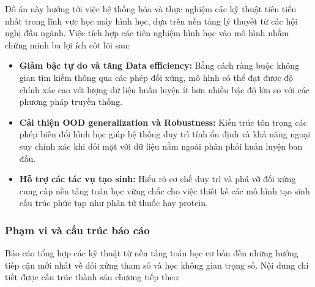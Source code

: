 Đồ án này hướng tới việc hệ thống hóa và thực nghiệm các kỹ thuật tiên tiến nhất trong lĩnh vực học máy hình học, dựa trên nền tảng lý thuyết từ các hội nghị đầu ngành. Việc tích hợp các tiên nghiệm hình học vào mô hình nhằm chứng minh ba lợi ích cốt lõi sau:

\begin{itemize}
    \item \textbf{Giảm bậc tự do và tăng Data efficiency:} Bằng cách ràng buộc không gian tìm kiếm thông qua các phép đối xứng, mô hình có thể đạt được độ chính xác cao với lượng dữ liệu huấn luyện ít hơn nhiều bậc độ lớn so với các phương pháp truyền thống.
    \item \textbf{Cải thiện OOD generalization và Robustness:} Kiến trúc tôn trọng các phép biến đổi hình học giúp hệ thống duy trì tính ổn định và khả năng ngoại suy chính xác khi đối mặt với dữ liệu nằm ngoài phân phối huấn luyện ban đầu.
    \item \textbf{Hỗ trợ các tác vụ tạo sinh:} Hiểu rõ cơ chế duy trì và phá vỡ đối xứng cung cấp nền tảng toán học vững chắc cho việc thiết kế các mô hình tạo sinh cấu trúc phức tạp như phân tử thuốc hay protein.
\end{itemize}

\subsubsection{Phạm vi và cấu trúc báo cáo}
\label{subsubsec:pham-vi-cau-truc}

Báo cáo tổng hợp các kỹ thuật từ nền tảng toán học cơ bản đến những hướng tiếp cận mới nhất về đối xứng tham số và học không gian trọng số. Nội dung chi tiết được cấu trúc thành sáu chương tiếp theo:

